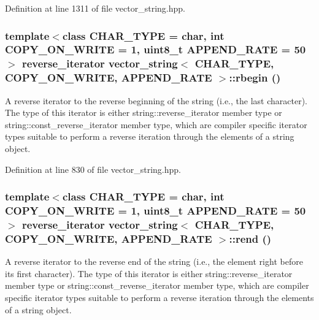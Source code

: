 Definition at line 1311 of file vector\_\-string.hpp.\hypertarget{classvector__string_8fc790b60af4ce060a8bfc9429d3ede2}{
\subsubsection[{rbegin}]{\setlength{\rightskip}{0pt plus 5cm}template$<$class CHAR\_\-TYPE  = char, int COPY\_\-ON\_\-WRITE = 1, uint8\_\-t APPEND\_\-RATE = 50$>$ reverse\_\-iterator {\bf vector\_\-string}$<$ CHAR\_\-TYPE, COPY\_\-ON\_\-WRITE, APPEND\_\-RATE $>$::rbegin ()}}
\label{classvector__string_8fc790b60af4ce060a8bfc9429d3ede2}


A reverse iterator to the reverse beginning of the string (i.e., the last character). The type of this iterator is either string::reverse\_\-iterator member type or string::const\_\-reverse\_\-iterator member type, which are compiler specific iterator types suitable to perform a reverse iteration through the elements of a string object. 

Definition at line 830 of file vector\_\-string.hpp.\hypertarget{classvector__string_d4bd42b7a1799784b864bb0d1a143453}{
\subsubsection[{rend}]{\setlength{\rightskip}{0pt plus 5cm}template$<$class CHAR\_\-TYPE  = char, int COPY\_\-ON\_\-WRITE = 1, uint8\_\-t APPEND\_\-RATE = 50$>$ reverse\_\-iterator {\bf vector\_\-string}$<$ CHAR\_\-TYPE, COPY\_\-ON\_\-WRITE, APPEND\_\-RATE $>$::rend ()}}
\label{classvector__string_d4bd42b7a1799784b864bb0d1a143453}


A reverse iterator to the reverse end of the string (i.e., the element right before its first character). The type of this iterator is either string::reverse\_\-iterator member type or string::const\_\-reverse\_\-iterator member type, which are compiler specific iterator types suitable to perform a reverse iteration through the elements of a string object. 

